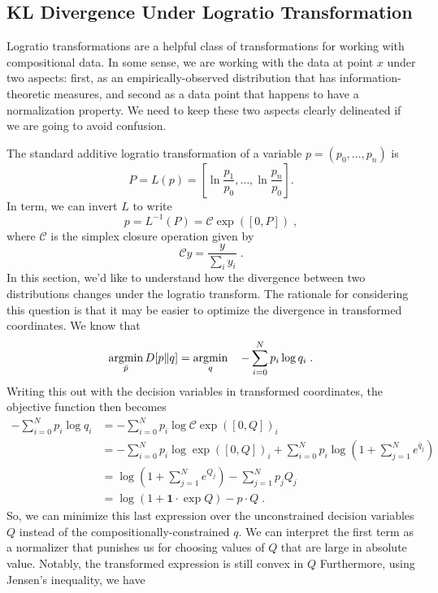 \documentclass[english]{scrartcl}
\newcommand{\argmin}{\operatornamewithlimits{argmin}}
\begin{document}
	\subsection{KL Divergence Under Logratio Transformation}
		Logratio transformations are a helpful class of transformations for working with compositional data. In some sense, we are working with the data at point $x$ under two aspects: first, as an empirically-observed distribution that has information-theoretic measures, and second as a data point that happens to have a normalization property. We need to keep these two aspects clearly delineated if we are going to avoid confusion. 

		The standard additive logratio transformation of a variable $p = (p_0, \ldots,p_n)$ is 
		\begin{equation}
			P = L(p) = \left[\ln \frac{p_1}{p_0},\ldots, \ln \frac{p_n}{p_0}\right]. 
		\end{equation}
		In term, we can invert $L$ to write 
		\begin{equation}
			p = L^{-1}(P) = \mathcal{C}\exp([0,P])\;,
		\end{equation}
		where $\mathcal{C}$ is the simplex closure operation given by 
		\begin{equation}
			\mathcal{C}y = \frac{y}{\sum_i y_i}\;.
		\end{equation}
		In this section, we'd like to understand how the divergence between two distributions changes under the logratio transform. The rationale for considering this question is that it may be easier to optimize the divergence in transformed coordinates. 
		We know that 
		\begin{equation}	
			\argmin_{\bar{p}} D[p\|q] = \argmin_{q} \quad - \sum_{i=0}^N p_i \log q_i\;.  
		\end{equation}
		Writing this out with the decision variables in transformed coordinates, the objective function then becomes 
		\begin{align}
			- \sum_{i=0}^N p_i \log q_i &= - \sum_{i=0}^N p_i \log \mathcal{C} \exp([0,Q])_i \\
			&= - \sum_{i=0}^N p_i \log  \exp([0,Q])_i + \sum_{i=0}^N p_i \log \left(1 + \sum_{j = 1}^N e^{\bar{q}_j}\right) \\
			&= \log \left(1 + \sum_{j = 1}^N e^{Q_j}\right) - \sum_{j=1}^N p_j Q_j \\
			&= \log (1 + \mathbf{1} \cdot \exp Q) - p\cdot Q\;.
		\end{align}
		So, we can minimize this last expression over the unconstrained decision variables $Q$ instead of the compositionally-constrained $q$. We can interpret the first term as a normalizer that punishes us for choosing values of $Q$ that are large in absolute value. Notably, the transformed expression is still convex in $Q$ Furthermore, using Jensen's inequality, we have 
\end{document}
